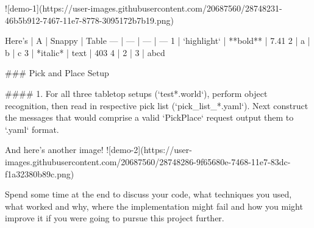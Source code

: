 \documentclass{article}
\begin{document}
![demo-1](https://user-images.githubusercontent.com/20687560/28748231-46b5b912-7467-11e7-8778-3095172b7b19.png)






Here's | A | Snappy | Table
--- | --- | --- | ---
1 | `highlight` | **bold** | 7.41
2 | a | b | c
3 | *italic* | text | 403
4 | 2 | 3 | abcd


### Pick and Place Setup

#### 1. For all three tabletop setups (`test*.world`), perform object recognition, then read in respective pick list (`pick_list_*.yaml`). Next construct the messages that would comprise a valid `PickPlace` request output them to `.yaml` format.

And here's another image! 
![demo-2](https://user-images.githubusercontent.com/20687560/28748286-9f65680e-7468-11e7-83dc-f1a32380b89c.png)

Spend some time at the end to discuss your code, what techniques you used, what worked and why, where the implementation might fail and how you might improve it if you were going to pursue this project further.  
\end{document}
